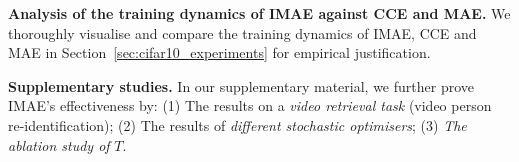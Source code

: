 \documentclass{article}
\begin{document}
\noindent
\textbf{Analysis of the training dynamics of IMAE against CCE and MAE.} 
We thoroughly visualise and compare the training dynamics of IMAE, CCE and MAE in Section~\ref{sec:cifar10_experiments} for empirical justification. 


  

\textbf{Supplementary studies.} 
In our supplementary material, we further prove IMAE's effectiveness by: (1) The results on a \textit{video retrieval task} (video person re-identification); (2) The results of \textit{different stochastic optimisers}; (3) 
\textit{The ablation study of} $T$.
\end{document}
